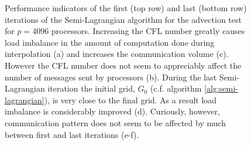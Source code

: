 \begin{figure}[htbp]
\begin{center}
	\end{center}
	\caption{Performance indicators of the first (top row) and last (bottom row) iterations of the Semi-Lagrangian algorithm for the advection test for $p=4096$ processors. Increasing the CFL number greatly causes load imbalance in the amount of computation done during interpolation (a) and increases the communication volume (c). However the CFL number does not seem to appreciably affect the number of messages sent by processors (b). During the last Semi-Lagrangian iteration the initial grid, $G_0$ (c.f. algorithm \ref{alg:semi-lagrangian}), is very close to the final grid. As a result load imbalance is considerably improved (d). Curiously, however, communication pattern does not seem to be affected by much between first and last iterations (e-f).}
	\label{fig:communication_4096}
\end{figure}



